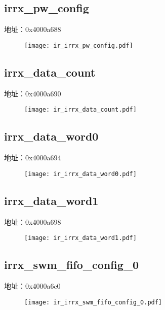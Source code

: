 \subsection{irrx\_pw\_config}
\label{ir-irrx-pw-config}
地址：0x4000a688
 \begin{figure}[H]
\texttt{[image: ir\_irrx\_pw\_config.pdf]}
\end{figure}

\subsection{irrx\_data\_count}
\label{ir-irrx-data-count}
地址：0x4000a690
 \begin{figure}[H]
\texttt{[image: ir\_irrx\_data\_count.pdf]}
\end{figure}

\subsection{irrx\_data\_word0}
\label{ir-irrx-data-word0}
地址：0x4000a694
 \begin{figure}[H]
\texttt{[image: ir\_irrx\_data\_word0.pdf]}
\end{figure}

\subsection{irrx\_data\_word1}
\label{ir-irrx-data-word1}
地址：0x4000a698
 \begin{figure}[H]
\texttt{[image: ir\_irrx\_data\_word1.pdf]}
\end{figure}

\subsection{irrx\_swm\_fifo\_config\_0}
\label{ir-irrx-swm-fifo-config-0}
地址：0x4000a6c0
 \begin{figure}[H]
\texttt{[image: ir\_irrx\_swm\_fifo\_config\_0.pdf]}
\end{figure}

